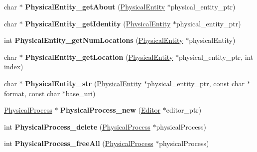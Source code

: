 \begin{DoxyCompactItemize}
\item 
\mbox{\label{namespaceomexmeta_a7f59e7b6f143fc61441cfb435262e1cb}} 
char $\ast$ {\bfseries Physical\+Entity\+\_\+get\+About} (\hyperlink{classomexmeta_1_1PhysicalEntity}{Physical\+Entity} $\ast$physical\+\_\+entity\+\_\+ptr)
\item 
\mbox{\label{namespaceomexmeta_aaa3ea01b3791ca3f7eb417457b07db6b}} 
char $\ast$ {\bfseries Physical\+Entity\+\_\+get\+Identity} (\hyperlink{classomexmeta_1_1PhysicalEntity}{Physical\+Entity} $\ast$physical\+\_\+entity\+\_\+ptr)
\item 
\mbox{\label{namespaceomexmeta_acc3cb121e83fea6627185101e64db8e9}} 
int {\bfseries Physical\+Entity\+\_\+get\+Num\+Locations} (\hyperlink{classomexmeta_1_1PhysicalEntity}{Physical\+Entity} $\ast$physical\+Entity)
\item 
\mbox{\label{namespaceomexmeta_a63e0d41567ae512005d7c9e50037e44e}} 
char $\ast$ {\bfseries Physical\+Entity\+\_\+get\+Location} (\hyperlink{classomexmeta_1_1PhysicalEntity}{Physical\+Entity} $\ast$physical\+\_\+entity\+\_\+ptr, int index)
\item 
\mbox{\label{namespaceomexmeta_a2ca2e5f41e156dc785bb858f82a088d4}} 
char $\ast$ {\bfseries Physical\+Entity\+\_\+str} (\hyperlink{classomexmeta_1_1PhysicalEntity}{Physical\+Entity} $\ast$physical\+\_\+entity\+\_\+ptr, const char $\ast$format, const char $\ast$base\+\_\+uri)
\item 
\mbox{\label{namespaceomexmeta_a4b7cef4fcdbd4502c94b18da2f85470f}} 
\hyperlink{classomexmeta_1_1PhysicalProcess}{Physical\+Process} $\ast$ {\bfseries Physical\+Process\+\_\+new} (\hyperlink{classomexmeta_1_1Editor}{Editor} $\ast$editor\+\_\+ptr)
\item 
\mbox{\label{namespaceomexmeta_a97146d9b855c53650e54c471f053a4dc}} 
int {\bfseries Physical\+Process\+\_\+delete} (\hyperlink{classomexmeta_1_1PhysicalProcess}{Physical\+Process} $\ast$physical\+Process)
\item 
\mbox{\label{namespaceomexmeta_a3ccca8297fc991baf57065570938ed84}} 
int {\bfseries Physical\+Process\+\_\+free\+All} (\hyperlink{classomexmeta_1_1PhysicalProcess}{Physical\+Process} $\ast$physical\+Process)

\end{DoxyCompactItemize}
